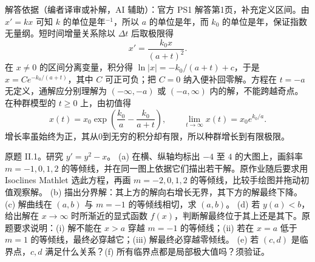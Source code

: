 \begin{solution}
解答依据（编者译审或补解，AI 辅助）：官方 PS1 解答第1页，补充定义区间。由 $x'=kx$ 可知 $k$ 的单位是年$^{-1}$，所以 $a$ 的单位是年，而 $k_0$ 的单位是年，保证指数无量纲。短时间增量关系除以 $\Delta t$ 后取极限得
\[
 x'=\frac{k_0x}{(a+t)^2}.
\]
在 $x\ne0$ 的区间分离变量，积分得 $\ln|x|=-k_0/(a+t)+c$，于是 $x=Ce^{-k_0/(a+t)}$，其中 $C$ 可正可负；把 $C=0$ 纳入便补回零解。方程在 $t=-a$ 无定义，通解应分别理解为 $(-\infty,-a)$ 或 $(-a,\infty)$ 内的解，不能跨越奇点。在种群模型的 $t\geq0$ 上，由初值得
\[
 x(t)=x_0\exp\left(\frac{k_0}{a}-\frac{k_0}{a+t}\right),
 \qquad\lim_{t\to\infty}x(t)=x_0e^{k_0/a}.
\]
增长率虽始终为正，其从0到无穷的积分却有限，所以种群增长到有限极限。
\end{solution}
\begin{exercise}\label{cw:ps1-II-1}
原题 II.1。研究 $y'=y^2-x$。
(a) 在横、纵轴均标出 $-4$ 至 $4$ 的大图上，画斜率 $m=-1,0,1,2$ 的等倾线，并在同一图上依据它们描出若干解。原作业随后要求用 Isoclines Mathlet 选此方程，再画 $m=-2,0,1,2$ 的等倾线，比较手绘图并拖动初值观察解。
(b) 描出分界解：其上方的解向右增长无界，其下方的解最终下降。
(c) 解曲线在 $(a,b)$ 与 $m=-1$ 的等倾线相切，求 $(a,b)$。
(d) 若 $y(a)<b$，给出解在 $x\to\infty$ 时所渐近的显式函数 $f(x)$，判断解最终位于其上还是其下。原题要求说明：(i) 解不能在 $x>a$ 穿越 $m=-1$ 的等倾线；(ii) 若在 $x=a$ 低于 $m=1$ 的等倾线，最终必穿越它；(iii) 解最终必穿越零倾线。
(e) 若 $(c,d)$ 是临界点，$c,d$ 满足什么关系？(f) 所有临界点都是局部极大值吗？须验证。
\end{exercise}
